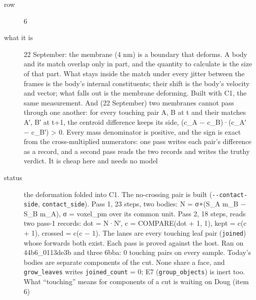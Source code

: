 \begin{description}
\item[{row}] 6
\item[{what it is}] 22 September: the membrane (4 nm) is a boundary that deforms. A body and its match overlap only in part, and the quantity to calculate is the size of that part. What stays inside the match under every jitter between the frames is the body's internal constituents; their shift is the body's velocity and vector; what falls out is the membrane deforming. Built with C1, the same measurement. And (22 September) two membranes cannot pass through one another: for every touching pair A, B at t and their matches A′, B′ at t+1, the centroid difference keeps its side, (c\_\allowbreak{}A − c\_\allowbreak{}B)·(c\_\allowbreak{}A′ − c\_\allowbreak{}B′) > 0. Every mass denominator is positive, and the sign is exact from the cross-multiplied numerators: one pass writes each pair's difference as a record, and a second pass reads the two records and writes the truthy verdict. It is cheap here and needs no model
\item[{status}] the deformation folded into C1. The no-crossing pair is built (\texttt{-\allowbreak{}-\allowbreak{}contact-\allowbreak{}side}, \texttt{contact\_\allowbreak{}side}). Pass 1, 23 steps, two bodies: N = σ∘(S\_\allowbreak{}A m\_\allowbreak{}B − S\_\allowbreak{}B m\_\allowbreak{}A), σ = voxel\_\allowbreak{}pm over its common unit. Pass 2, 18 steps, reads two pass-1 records: dot = N·N′, c = COMPARE(dot + 1, 1), kept = c(c + 1), crossed = c(c − 1). The lanes are every touching leaf pair (\texttt{joined}) whose forwards both exist. Each pass is proved against the host. Ran on 44b6\_\allowbreak{}0113de3b and three 6bba: 0 touching pairs on every sample. Today's bodies are separate components of the cut. None share a face, and \texttt{grow\_\allowbreak{}leaves} writes \texttt{joined\_\allowbreak{}count} = 0; E7 (\texttt{group\_\allowbreak{}objects}) is inert too. What “touching” means for components of a cut is waiting on Doug (item 6)
\end{description}


